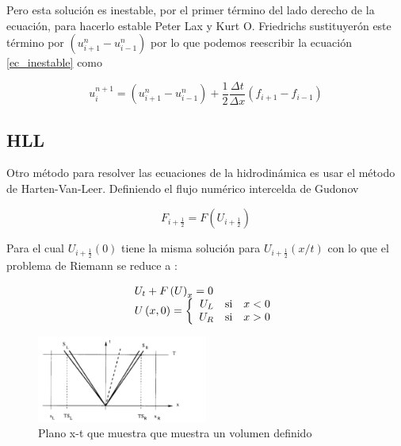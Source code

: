 \documentclass[12pt,a4paper]{book}
\begin{document}
Pero esta solución es inestable, por el primer término del lado derecho de la ecuación, para hacerlo estable  Peter Lax y Kurt O. Friedrichs sustituyerón este término por $(u_{i+1}^n-u_{i-1}^n)$  por lo que podemos reescribir la ecuación \ref{ec_inestable} como

\begin{equation}\label{ec_estable}
u_i^{n+1} =(u_{i+1}^n-u_{i-1}^n) + \frac{1}{2}\frac{\Delta t}{\Delta x} \left(f_{i+1} - f_{i-1} \right)
\end{equation}


\subsection{HLL}

	Otro método para resolver las ecuaciones de la hidrodinámica es usar el método de Harten-Van-Leer. Definiendo el flujo numérico intercelda de Gudonov

\begin{equation}
F_{i+\frac{1}{2}}=F \left( U_{i+\frac{1}{2}} \right)
\end{equation}

Para el cual $U_{i+\frac{1}{2}}(0)$ tiene la misma solución para $U_{i+\frac{1}{2}}(x/t)$ con lo que el problema de Riemann se reduce a :

\begin{equation} \label{Ecuacion_discreta_conservada}
\begin{array}{ll}
U_t + F \left( U \right)_x = 0 \\
U \left(x,0 \right) = 
\left\lbrace
\begin{array}{rr}
U_L \quad \textup{si} \quad x<0  \\
U_R \quad \textup{si} \quad x>0
\end{array}
\right.
\end{array}
\end{equation}

\begin{figure} %
  \centering
    \includegraphics[width=0.5\textwidth]{Figuras/HLL_onda.png}
  \caption{Plano x-t que muestra que muestra un volumen definido}
  \label{fig:Plano x_t}
\end{figure}
\end{document}
